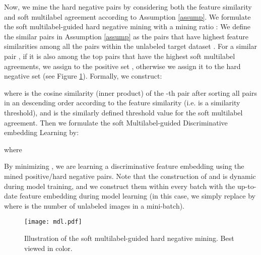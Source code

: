 \documentclass[10pt,twocolumn,letterpaper]{article}
\begin{document}
Now, we mine the hard negative pairs by considering both the feature
similarity and soft multilabel agreement according to Assumption \ref{assump}.
We formulate the soft multilabel-guided hard negative mining with a mining ratio :
We define the similar pairs in Assumption \ref{assump} as the  pairs
that have highest feature similarities among all the
 pairs within the unlabeled target dataset .
For a similar pair , if it is also among the top  pairs that have the highest soft multilabel agreements,
we assign  to the positive set , otherwise we
assign it to the hard negative set  (see Figure \ref{fig:MDL}).
Formally, we construct:
{\small

}where  is the cosine similarity (inner product) of the -th pair after sorting all  pairs in an descending order according to the feature similarity
(i.e.  is a similarity threshold),
and  is the similarly defined threshold value for the soft multilabel agreement.
Then we formulate the soft Multilabel-guided Discriminative embedding Learning by:
{\small

}where
{\small

}By minimizing ,
we are learning a discriminative feature embedding using the mined positive/hard negative pairs.
Note that the construction of  and  is
dynamic during model training,
and we construct them within every batch with the up-to-date feature
embedding during model learning
(in this case, we simply replace  by 
where  is the number of unlabeled images in a mini-batch).

\begin{figure}[t]
\begin{center}
\texttt{[image: mdl.pdf]}
\end{center}
\vspace{-0.2cm}
   \caption{Illustration of the soft multilabel-guided hard negative mining.
   Best viewed in color.
   }
\vspace{-0.2cm}
\label{fig:MDL}
\end{figure}
\end{document}
